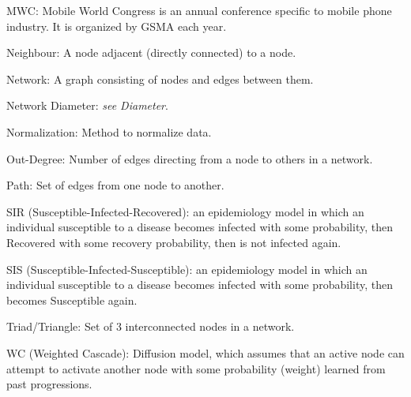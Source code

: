 MWC: Mobile World Congress is an annual conference specific to mobile phone industry. It is organized by GSMA each year.

Neighbour: A node adjacent (directly connected) to a node.

Network: A graph consisting of nodes and edges between them.

Network Diameter: \textit{see Diameter}.

Normalization: Method to normalize data.

Out-Degree: Number of edges directing from a node to others in a network.

Path: Set of edges from one node to another.

SIR (Susceptible-Infected-Recovered): an epidemiology model in which an individual susceptible to a disease becomes infected with some probability, then Recovered with some recovery probability, then is not infected again.

SIS (Susceptible-Infected-Susceptible): an epidemiology model in which an individual susceptible to a disease becomes infected with some probability, then becomes Susceptible again.

Triad/Triangle: Set of 3 interconnected nodes in a network.

WC (Weighted Cascade): Diffusion model, which assumes that an active node can attempt to activate another node with some probability (weight) learned from past progressions.
